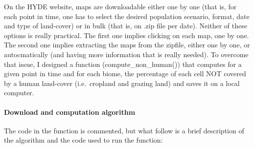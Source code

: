 \documentclass[]{article}
\let\oldparagraph\paragraph
\renewcommand{\paragraph}[1]{\oldparagraph{#1}\mbox{}}
\begin{document}
On the HYDE website, maps are downloadable either one by one (that is,
for each point in time, one has to select the desired population
scenario, format, date and type of land-cover) or in bulk (that is, on
.zip file per date). Neither of these options is really practical. The
first one implies clicking on each map, one by one. The second one
implies extracting the maps from the zipfile, either one by one, or
autocmatically (and having more information that is really needed). To
overcome that issue, I designed a function (compute\_non\_human()) that
computes for a given point in time and for each biome, the percentage of
each cell NOT covered by a human land-cover (i.e.~cropland and grazing
land) and saves it on a local computer.

\paragraph{Download and computation
algorithm}\label{download-and-computation-algorithm}

The code in the function is commented, but what follow is a brief
description of the algorithm and the code used to run the function:
\end{document}
